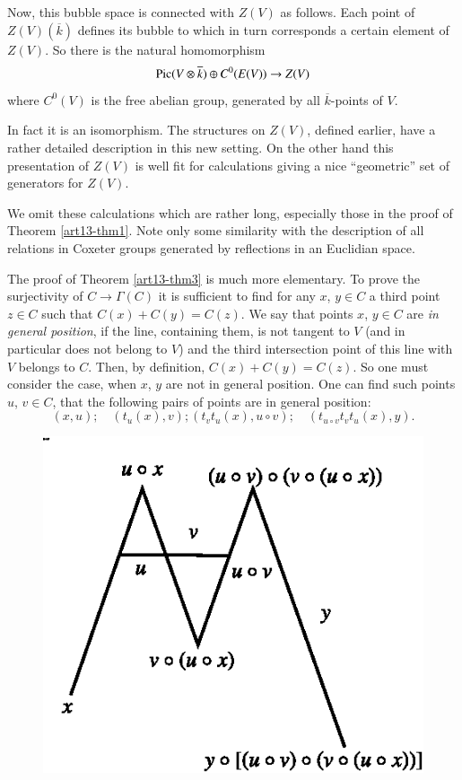 Now, this bubble space is connected with $Z(V)$ as follows. Each point of $Z(V)(\overline{k})$ defines its bubble to which in turn corresponds a certain element of $Z(V)$. So there is the natural homomorphism
$$
\operatorname{\mathrm{Pic}} (V\otimes \overline{k})\oplus C^{0}(E(V))\to Z(V)
$$
where $C^{0}(V)$ is the free abelian group, generated by all $\overline{k}$-points of $V$.

In fact it is an isomorphism. The structures on $Z(V)$, defined earlier, have a rather detailed description in this new setting. On the other hand this presentation of $Z(V)$ is well fit for calculations giving a nice ``geometric'' set of generators for $Z(V)$.

We omit these calculations which are rather long, especially those in the proof of Theorem \ref{art13-thm1}. Note only some similarity with the description of all relations in Coxeter groups generated by reflections in an Euclidian space.

The proof of Theorem \ref{art13-thm3} is much more elementary. To prove the surjectivity of $C\to \Gamma(C)$ it is sufficient to find for any $x$, $y\in C$ a third point $z\in C$ such that $C(x)+C(y)=C(z)$. We say that points $x$, $y\in C$ are {\em in general position}, if the line, containing them, is not tangent to $V$ (and in particular does not belong to $V$) and the third intersection point of this line with $V$ belongs to $C$. Then, by definition, $C(x)+C(y)=C(z)$. So one must consider the case, when $x$, $y$ are not in general position. One can find such points\pageoriginale $u$, $v\in C$, that the following pairs of points are in general position:
$$
(x,u);\quad (t_{u}(x),v); (t_{v}t_{u}(x),u\circ v);\quad (t_{u\circ v}t_{v}t_{u}(x),y).
$$
\begin{figure}[H]
\centering
\includegraphics{src/chap13/fig1.eps}
\end{figure}

